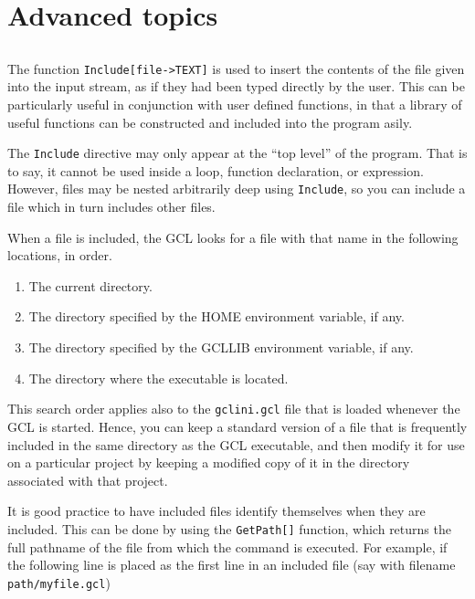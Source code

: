 \chapter{Advanced topics}

\section{}

The function \verb+Include[file->TEXT]+ is used to
insert the contents of the file given into the input stream, as if
they had been typed directly by the user.  This can be particularly
useful in conjunction with user defined functions, in that a library
of useful functions can be constructed and included into the program
asily.

The \verb+Include+ directive may only appear at the ``top level'' of
the program.  That is to say, it cannot be used inside a loop,
function declaration, or expression.  However, files may be nested
arbitrarily deep using {\tt Include}, so you can include a file which
in turn includes other files.
  
When a file is included, the GCL looks for a file with that name in
the following locations, in order.  
\begin{enumerate}
\item The current directory.
\item The directory specified by the HOME environment variable, if any.
\item The directory specified by the GCLLIB environment variable, if any.
\item The directory where the executable is located.
\end{enumerate}

This search order applies also to the \verb+gclini.gcl+ file that is
loaded whenever the GCL is started.  Hence, you can keep a standard
version of a file that is frequently included in the same directory as
the GCL executable, and then modify it for use on a particular project
by keeping a modified copy of it in the directory associated with that
project.  

It is good practice to have included files identify themselves when
they are included. This can be done by using the
\verb+GetPath[]+ function, which returns the full
pathname of the file from which the command is executed.  For example,
if the following line is placed as the first line in an included file
(say with filename \verb+path/myfile.gcl+)

